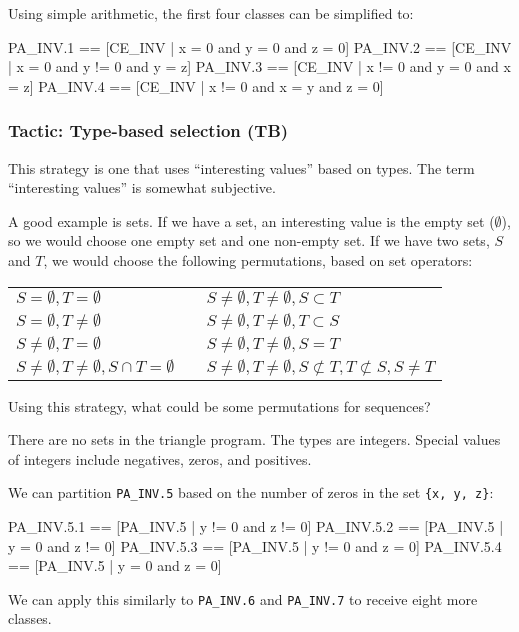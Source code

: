 \begin{example}
Using simple arithmetic, the first four classes can be simplified to:

\lstset{aboveskip=3mm}
\lstset{language=}
\begin{alloy}
PA_INV.1 == [CE_INV | x = 0 and y = 0 and z = 0]
PA_INV.2 == [CE_INV | x = 0 and y != 0 and y = z]
PA_INV.3 == [CE_INV | x != 0 and y = 0 and x = z]
PA_INV.4 == [CE_INV | x != 0 and x = y and z = 0]
\end{alloy}
\end{example}



\subsubsection{Tactic: Type-based selection (TB)}

This strategy is one that uses ``interesting values'' based on types. The term ``interesting values'' is somewhat subjective.

A good example is sets. If we have a set, an interesting value is the empty set ($\emptyset$), so we would choose one empty set and one non-empty set. If we have two sets, $S$ and $T$, we would choose the following permutations, based on set operators:

\begin{tabular}{lll}
  $S = \emptyset, T = \emptyset$ & &
    $S \neq \emptyset, T \neq \emptyset, S \subset T$  \\
  $S = \emptyset, T \neq \emptyset$ & & 
    $S \neq \emptyset, T \neq \emptyset, T \subset S$  \\
  $S \neq \emptyset, T = \emptyset$ & & 
    $S \neq \emptyset, T \neq \emptyset, S= T$  \\
  $S \neq \emptyset, T \neq \emptyset, S \cap T = \emptyset$ & &
    $S \neq \emptyset, T \neq \emptyset, S \not\subset T,
     T \not\subset S, S \neq T$
\end{tabular}


\begin{exercise}
Using this strategy, what could be some permutations for sequences?
\end{exercise}

\begin{example}
There are no sets in the triangle program. The types are integers. Special values of integers include negatives, zeros, and positives.

We can partition \texttt{PA\_INV.5} based on the number of zeros in the set \texttt{\{x, y, z\}}:

\lstset{aboveskip=3mm}
\lstset{language=}
\begin{alloy}
PA_INV.5.1 == [PA_INV.5 | y != 0 and z != 0]
PA_INV.5.2 == [PA_INV.5 | y = 0 and z != 0]
PA_INV.5.3 == [PA_INV.5 | y != 0 and z = 0]
PA_INV.5.4 == [PA_INV.5 | y = 0 and z = 0]
\end{alloy}

We can apply this similarly to \texttt{PA\_INV.6} and \texttt{PA\_INV.7} to receive eight more classes.
\end{example}

